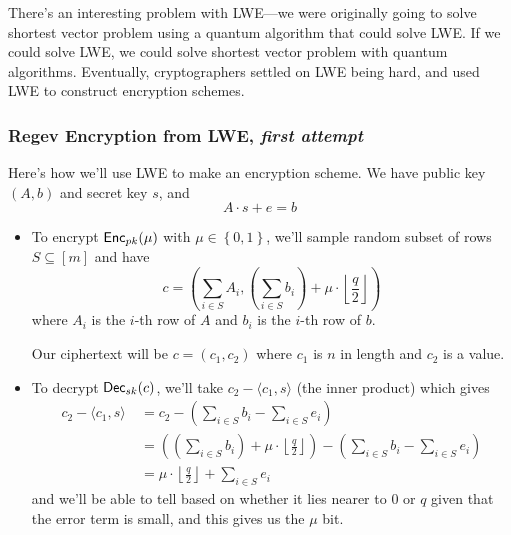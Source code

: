 \begin{remark*}
    There's an interesting problem with LWE---we were originally going to solve shortest vector problem using a quantum algorithm that could solve LWE. If we could solve LWE, we could solve shortest vector problem with quantum algorithms. Eventually, cryptographers settled on LWE being hard, and used LWE to construct encryption schemes.
\end{remark*}

\subsubsection{Regev Encryption from LWE, \emph{first attempt}}
Here's how we'll use LWE to make an encryption scheme. We have public key $(A, b)$ and secret key $s$, and
\[A\cdot s + e = b\]
\begin{itemize}
    \item To encrypt $\operatorname{\mathsf{Enc}}_{pk}(\mu)$ with $\mu\in \left\{ 0,1 \right\}$, we'll sample random subset of rows $S\subseteq [m]$ and have
          \[c = \left( \sum_{i\in S}A_i, \left( \sum_{i\in S}b_i \right) + \mu\cdot \left\lfloor \frac{q}{2}\right\rfloor \right)\]
          where $A_i$ is the $i$-th row of $A$ and $b_i$ is the $i$-th row of $b$.

          Our ciphertext will be $c=(c_1, c_2)$ where $c_1$ is $n$ in length and $c_2$ is a value.
    \item To decrypt $\operatorname{\mathsf{Dec}}_{sk}(c)$, we'll take $c_2 - \langle c_1, s\rangle$ (the inner product) which gives
          \begin{align*}
              c_2 - \langle c_1, s\rangle \
               & = c_2 - \left( \sum_{i\in S}b_i - \sum_{i\in S}e_i \right)                                                                                             \\
               & = \left( \left( \sum_{i\in S}b_i \right) + \mu\cdot \left\lfloor \frac{q}{2}\right\rfloor \right) - \left( \sum_{i\in S}b_i - \sum_{i\in S}e_i \right) \\
               & = \mu\cdot \left\lfloor \frac{q}{2}\right\rfloor + \sum_{i\in S}e_i
          \end{align*}
          and we'll be able to tell based on whether it lies nearer to $0$ or $q$ given that the error term is small, and this gives us the $\mu$ bit.
\end{itemize}

